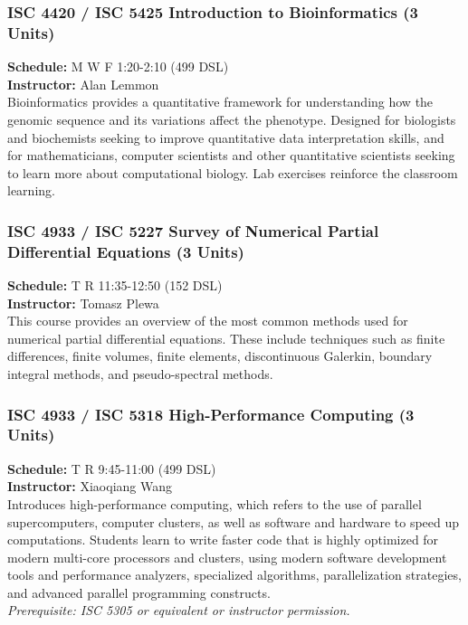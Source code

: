 \documentclass[12pt,a4paper]{article}
\begin{document}
\subsubsection*{ISC 4420 / ISC 5425 Introduction to Bioinformatics (3 Units)}
\textbf{Schedule:} M W F 1:20-2:10 (499 DSL) \\
\textbf{Instructor:} Alan Lemmon \\
Bioinformatics provides a quantitative framework for understanding how the genomic sequence and its variations affect the phenotype. Designed for biologists and biochemists seeking to improve quantitative data interpretation skills, and for mathematicians, computer scientists and other quantitative scientists seeking to learn more about computational biology. Lab exercises reinforce the classroom learning.

\subsubsection*{ISC 4933 / ISC 5227 Survey of Numerical Partial Differential Equations (3 Units)}
\textbf{Schedule:} T R 11:35-12:50 (152 DSL) \\
\textbf{Instructor:} Tomasz Plewa \\
This course provides an overview of the most common methods used for numerical partial differential equations. These include techniques such as finite differences, finite volumes, finite elements, discontinuous Galerkin, boundary integral methods, and pseudo-spectral methods.

\subsubsection*{ISC 4933 / ISC 5318 High-Performance Computing (3 Units)}
\textbf{Schedule:} T R 9:45-11:00 (499 DSL) \\
\textbf{Instructor:} Xiaoqiang Wang \\
Introduces high-performance computing, which refers to the use of parallel supercomputers, computer clusters, as well as software and hardware to speed up computations. Students learn to write faster code that is highly optimized for modern multi-core processors and clusters, using modern software development tools and performance analyzers, specialized algorithms, parallelization strategies, and advanced parallel programming constructs. \\
\textit{Prerequisite: ISC 5305 or equivalent or instructor permission.}
\end{document}
